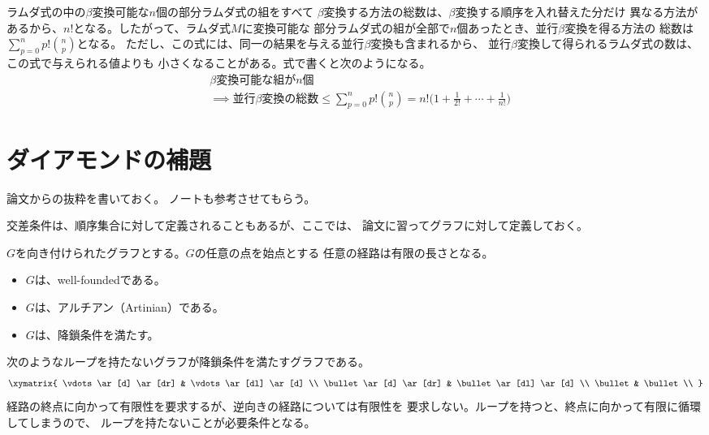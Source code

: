 {	ラムダ式の中の$\beta$変換可能な$n$個の部分ラムダ式の組をすべて
	$\beta$変換する方法の総数は、$\beta$変換する順序を入れ替えた分だけ
	異なる方法があるから、$n!$となる。したがって、ラムダ式$M$に変換可能な
	部分ラムダ式の組が全部で$n$個あったとき、並行$\beta$変換を得る方法の
	総数は$\sum_{p=0}^np!\binom{n}{p}$となる。
	ただし、この式には、同一の結果を与える並行$\beta$変換も含まれるから、
	並行$\beta$変換して得られるラムダ式の数は、この式で与えられる値よりも
	小さくなることがある。式で書くと次のようになる。
	\begin{equation*}\begin{split}
		& \text{$\beta$変換可能な組が$n$個} \\
		& \implies \text{並行$\beta$変換の総数}
		\le \sum_{p=0}^np!\binom{n}{p}
		= n!\biggl(1+\frac{1}{2!}+\cdots+\frac{1}{n!}\biggr)
	\end{split}\end{equation*}
\section{ダイアモンドの補題}\label{s1:ダイアモンドの補題} %
	論文\cite{Hevlicek2010Diamond}からの抜粋を書いておく。
	ノート\cite{KhareDiamond}も参考させてもらう。

	交差条件は、順序集合に対して定義されることもあるが、ここでは、
	論文\cite{Hevlicek2010Diamond}に習ってグラフに対して定義しておく。

	\begin{definition}[降鎖条件]\label{def:降鎖条件} %
		$G$を向き付けられたグラフとする。$G$の任意の点を始点とする
		任意の経路は有限の長さとなる。
		\begin{itemize}\setlength{\itemsep}{-1mm} %
			\item $G$は、well-foundedである。
			\item $G$は、アルチアン（Artinian）である。
			\item $G$は、降鎖条件を満たす。
		\end{itemize} %
	\end{definition} %

	次のようなループを持たないグラフが降鎖条件を満たすグラフである。
	\begin{equation*}\begin{split}
		\xymatrix{
			\vdots \ar[d] \ar[dr] & \vdots \ar[dl] \ar[d] \\
			\bullet \ar[d] \ar[dr] & \bullet \ar[dl] \ar[d] \\
			\bullet & \bullet \\
		}
	\end{split}\end{equation*}
	経路の終点に向かって有限性を要求するが、逆向きの経路については有限性を
	要求しない。ループを持つと、終点に向かって有限に循環してしまうので、
	ループを持たないことが必要条件となる。

}
